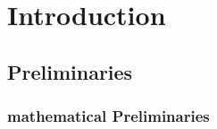 \chapter{Introduction}

%
%
%

\section{ Preliminaries }

\subsection{ mathematical Preliminaries }


